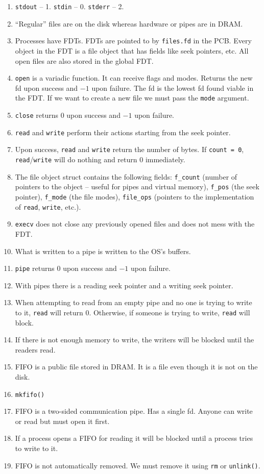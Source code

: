 \documentclass[12pt,a4paper]{article}
\begin{document}
\begin{enumerate}
  \item \texttt{stdout} -- 1. \texttt{stdin} -- 0. \texttt{stderr} -- 2.
  \item ``Regular'' files are on the disk whereas hardware or pipes are in DRAM.
  \item Processes have FDTs. FDTs are pointed to by \texttt{files.fd} in the PCB. Every object in the FDT is a file object that has fields like seek pointers, etc. All open files are also stored in the global FDT.
  \item \texttt{open} is a variadic function. It can receive flags and modes. Returns the new fd upon success and $-1$ upon failure. The fd is the lowest fd found viable in the FDT. If we want to create a new file we must pass the \texttt{mode} argument.
  \item \texttt{close} returns 0 upon success and $-1$ upon failure.
  \item \texttt{read} and \texttt{write} perform their actions starting from the seek pointer.
  \item Upon success, \texttt{read} and \texttt{write} return the number of bytes. If \texttt{count = 0}, \texttt{read}/\texttt{write} will do nothing and return 0 immediately.
  \item The file object struct contains the following fields: \texttt{f\_count} (number of pointers to the object -- useful for pipes and virtual memory), \texttt{f\_pos} (the seek pointer), \texttt{f\_mode} (the file modes), \texttt{file\_ops} (pointers to the implementation of \texttt{read}, \texttt{write}, etc.).
  \item \texttt{execv} does not close any previously opened files and does not mess with the FDT.
  \item What is written to a pipe is written to the OS's buffers.
  \item \texttt{pipe} returns 0 upon success and $-1$ upon failure.
  \item With pipes there is a reading seek pointer and a writing seek pointer.
  \item When attempting to read from an empty pipe and no one is trying to write to it, \texttt{read} will return 0. Otherwise, if someone is trying to write, \texttt{read} will block.
  \item If there is not enough memory to write, the writers will be blocked until the readers read.
  \item FIFO is a public file stored in DRAM. It is a file even though it is not on the disk.
  \item \texttt{mkfifo()}
  \item FIFO is a two-sided communication pipe. Has a single fd. Anyone can write or read but must open it first.
  \item If a process opens a FIFO for reading it will be blocked until a process tries to write to it.
  \item FIFO is not automatically removed. We must remove it using \texttt{rm} or \texttt{unlink()}.
\end{enumerate}
\end{document}
